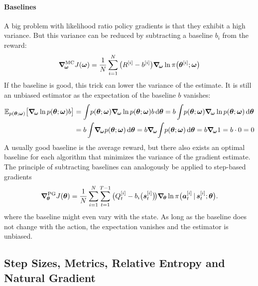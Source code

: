 				\paragraph{Baselines}
					A big problem with likelihood ratio policy gradients is that they exhibit a high variance. But this variance can be reduced by subtracting a baseline \(b_i\) from the reward:
					\begin{equation}
						\grad_{\!\bm{\omega}}^\mathrm{MC} J(\bm{\omega})
							= \frac{1}{N} \sum_{i = 1}^{N} \big(R^{[i]} - b^{[i]}\big) \grad_{\!\bm{\omega}} \ln \pi\big(\bm{\theta}^{[i]}; \bm{\omega}\big)  \label{eq:policyGradientWithBaseline}
					\end{equation}
					If the baseline is good, this trick can lower the variance of the estimate. It is still an unbiased estimator as the expectation of the baseline \(b\) vanishes:
					\begin{align*}
						\E_{p(\vec{\theta}; \vec{\omega})}\big[ \grad_{\!\vec{\omega}} \ln p(\vec{\theta}; \vec{\omega}) b \big]
							&= \int\! p(\vec{\theta}; \vec{\omega}) \grad_{\!\vec{\omega}} \ln p(\vec{\theta}; \vec{\omega}) b \dd{\vec{\theta}}
							 = b \int\! p(\vec{\theta}; \vec{\omega}) \grad_{\!\vec{\omega}} \ln p(\vec{\theta}; \vec{\omega}) \dd{\vec{\theta}} \\
							&= b \int\! \grad_{\!\vec{\omega}} p(\vec{\theta}; \vec{\omega}) \dd{\vec{\theta}}
							 = b \grad_{\!\vec{\omega}} \!\int\!  p(\vec{\theta}; \vec{\omega}) \dd{\vec{\theta}}
							 = b \grad_{\!\vec{\omega}} 1
							 = b \cdot 0
							 = 0
					\end{align*}
					A usually good baseline is the average reward, but there also exists an optimal baseline for each algorithm that minimizes the variance of the gradient estimate. The principle of subtracting baselines can analogously be applied to step-based gradients
					\begin{equation*}
						\grad_{\!\bm{\theta}}^\mathrm{PG} J(\bm{\theta})
							= \frac{1}{N} \sum_{i = 1}^{N} \sum_{t = 1}^{T - 1} \big( Q_t^{[i]} - b_i\big(\bm{s}_t^{[i]}\big) \!\big) \grad_{\!\bm{\theta}} \ln \pi\big(\bm{a}_t^{[i]} \,\vert\, \bm{s}_t^{[i]}; \bm{\theta}\big).
					\end{equation*}
					where the baseline might even vary with the state. As long as the baseline does not change with the action, the expectation vanishes and the estimator is unbiased.

		\subsection{Step Sizes, Metrics, Relative Entropy and Natural Gradient} %
			\label{subsec:policySearchMetrics}

